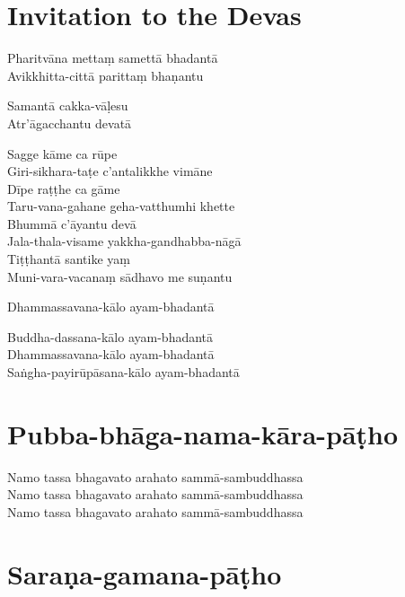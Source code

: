 
\chapter{Invitation to the Devas}%


\begin{paritta}
%
Pharitvāna mettaṃ samettā bhadantā\\
Avikkhitta-cittā parittaṃ bhaṇantu

%
Samantā cakka-vāḷesu\\
Atr'āgacchantu devatā

Sagge kāme ca rūpe\\
Giri-sikhara-taṭe c'antalikkhe vimāne\\
Dīpe raṭṭhe ca gāme\\
Taru-vana-gahane geha-vatthumhi khette\\
Bhummā c'āyantu devā\\
Jala-thala-visame yakkha-gandhabba-nāgā\\
Tiṭṭhantā santike yaṃ\\
Muni-vara-vacanaṃ sādhavo me suṇantu

Dhammassavana-kālo ayam-bhadantā


Buddha-dassana-kālo ayam-bhadantā\\
Dhammassavana-kālo ayam-bhadantā\\
Saṅgha-payirūpāsana-kālo ayam-bhadantā
\end{paritta}

\clearpage

\chapter{Pubba-bhāga-nama-kāra-pāṭho}%


\begin{paritta}
Namo tassa bhagavato arahato sammā-sambuddhassa\\
Namo tassa bhagavato arahato sammā-sambuddhassa\\
Namo tassa bhagavato arahato sammā-sambuddhassa
\end{paritta}

\chapter{Saraṇa-gamana-pāṭho}%

